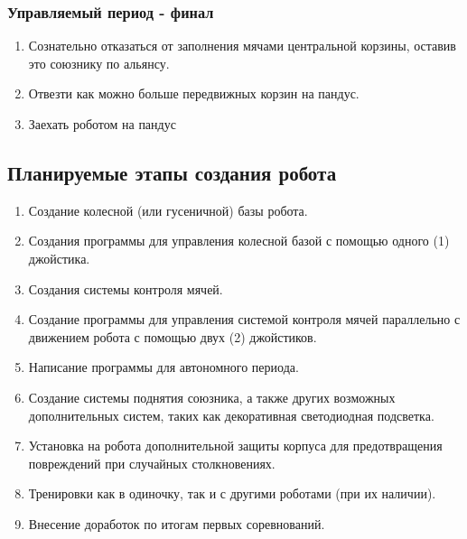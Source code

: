 \subsubsection{Управляемый период - финал}
\begin{enumerate}
	\item Сознательно отказаться от заполнения мячами центральной корзины, оставив это союзнику по альянсу.
	\item Отвезти как можно больше передвижных корзин на пандус.
	\item Заехать роботом на пандус 
\end{enumerate}

\fillpage

\subsection{Планируемые этапы создания робота}
\begin{enumerate}
	\item Создание колесной (или гусеничной) базы робота.
	\item Создания программы для управления колесной базой с помощью одного (1) джойстика.
	\item Создания системы контроля мячей.
	\item Создание программы для управления системой контроля мячей параллельно с движением робота с помощью двух (2) джойстиков.
	\item Написание программы для автономного периода.
	\item Создание системы поднятия союзника, а также других возможных дополнительных систем, таких как декоративная светодиодная подсветка.
	\item Установка на робота дополнительной защиты корпуса для предотвращения повреждений при случайных столкновениях.
	\item Тренировки как в одиночку, так и с другими роботами (при их наличии).
	\item Внесение доработок по итогам первых соревнований.
\end{enumerate}
	
\fillpage
